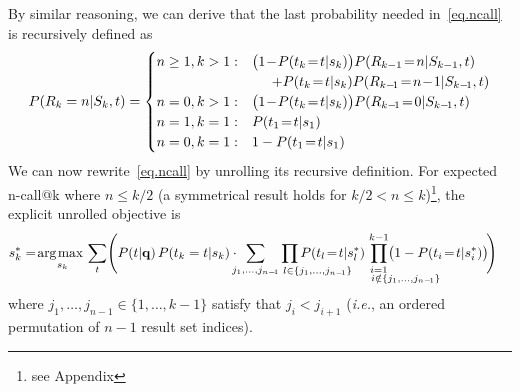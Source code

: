 By similar reasoning, we can derive that the last probability 
needed in~\eqref{eq.ncall} is recursively defined as 
\begin{align*}
P(R_k=n|S_k,t)=
\begin{cases}
n \geq 1, k > 1:  &  \bigl( 1\!-\!P(t_k\!=\!t|s_k) \bigr) P(R_{k-1}\!=\!n|S_{k-1},t) \nonumber \\
  & \hspace{5mm} + P(t_k\!=\!t|s_k) P(R_{k-\!1}\!=\!n\!-\!1|S_{k-\!1},t) \\
n = 0, k > 1:   & \bigl( 1\!-\!P(t_k\!=\!t|s_k) \bigr) P(R_{k-\!1}\!=\!0|S_{k-\!1},t) \\
n = 1, k = 1:   & P(t_1\!=\!t|s_1) \\
n = 0, k = 1:   & 1 - P(t_1\!=\!t|s_1)
\end{cases}
\end{align*}
We can now rewrite~\eqref{eq.ncall} by unrolling its recursive definition.
For expected n-call@k where $n \leq k/2$ %
(a symmetrical result holds for $k/2 < n \leq k$)\footnote{see Appendix}, the explicit unrolled objective is 
\begin{align}
  & s_k^* = \argmax_{s_k} \sum_t \Biggl( P(t|\vec{q}) \, P(t_k=t|s_k) \cdot \hspace{-2mm} \sum_{j_1, \dots, j_{n-\!1}} \hspace{-14mm} \prod_{\hspace{14.5mm} l \in \{j_1, \dots, j_{n-\!1}\}} \hspace{-14mm} P(t_l\!=\!t|s_l^*) \hspace{-13mm} \prod_{\substack{i=1 \\ \hspace{14mm} i \notin \{j_1, \dots, j_{n-\!1}\}}}^{k-1} \hspace{-13mm} \!\bigl( 1 - P(t_i\!=\!t|s_i^*) \bigr) \!\Biggr) \label{eq.ncall.alt}
\end{align}
where $j_1, \dots, j_{n-1} \in \{1,\ldots,k-1\}$ satisfy 
that $j_i < j_{i+1}$ (\emph{i.e.},
an ordered permutation of $n-1$ result set indices).



